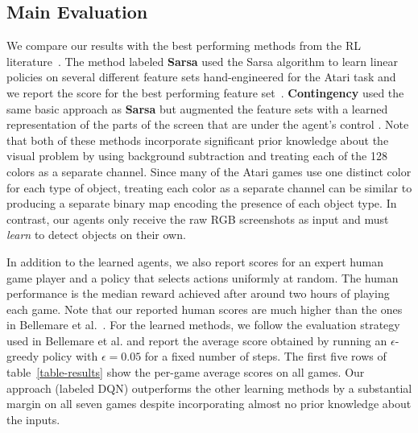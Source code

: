 \subsection{Main Evaluation}

We compare our results with the best performing methods from the RL literature~\cite{bellemare-ale,bellemare-contingency}.  The method labeled \textbf{Sarsa} used the Sarsa algorithm to learn linear policies on several different feature sets hand-engineered for the Atari task and we report the score for the best performing feature set~\cite{bellemare-ale}.  \textbf{Contingency} used the same basic approach as \textbf{Sarsa} but augmented the feature sets with a learned representation of the parts of the screen that are under the agent's control \cite{bellemare-contingency}.  Note that both of these methods incorporate significant prior knowledge about the visual problem by using background subtraction and treating each of the 128 colors as a separate channel.  Since many of the Atari games use one distinct color for each type of object, treating each color as a separate channel can be similar to producing a separate binary map encoding the presence of each object type.  In contrast, our agents only receive the raw RGB screenshots as input and must \emph{learn} to detect objects on their own.   

In addition to the learned agents, we also report scores for an expert human game player and a policy that selects actions uniformly at random. The human performance is the median reward achieved after around two hours of playing each game. Note that our reported human scores are much higher than the ones in Bellemare et al.~\cite{bellemare-ale}.  For the learned methods, we follow the evaluation strategy used in Bellemare et al. \cite{bellemare-ale,bellemare:qtf} and report the average score obtained by running an $\epsilon$-greedy policy with $\epsilon=0.05$ for a fixed number of steps. The first five rows of table~\ref{table-results} show the per-game average scores on all games.  Our approach (labeled DQN) outperforms the other learning methods by a substantial margin on all seven games despite incorporating almost no prior knowledge about the inputs.   


